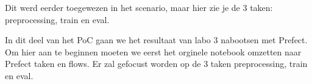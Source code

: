 Dit werd eerder toegewezen in het scenario, maar hier zie je de 3 taken: preprocessing, train en eval.

In dit deel van het PoC gaan we het resultaat van labo 3 nabootsen met Prefect.
Om hier aan te beginnen moeten we eerst het orginele notebook omzetten naar Prefect taken en flows. Er zal gefocust worden op de 3 taken preprocessing, train en eval.


